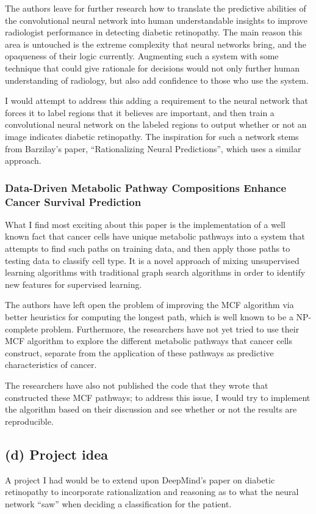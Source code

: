 \documentclass[11pt]{article}
\begin{document}
The authors leave for further research how to translate the predictive
abilities of the convolutional neural network into human understandable
insights to improve radiologist performance in detecting diabetic retinopathy.
The main reason this area is untouched is the extreme complexity that neural
networks bring, and the opaqueness of their logic currently. Augmenting such
a system with some technique that could give rationale for decisions would
not only further human understanding of radiology, but also add confidence
to those who use the system.

I would attempt to address this adding a requirement to the neural network
that forces it to label regions that it believes are important, and then
train a convolutional neural network on the labeled regions to output
whether or not an image indicates diabetic retinopathy. The inspiration
for such a network stems from Barzilay's paper, ``Rationalizing Neural
Predictions'', which uses a similar approach.

\subsubsection*{Data-Driven Metabolic Pathway Compositions Enhance Cancer Survival Prediction}
What I find most exciting about this paper is the implementation of a well
known fact that cancer cells have unique metabolic pathways into a system
that attempts to find such paths on training data, and then apply those paths
to testing data to classify cell type. It is a novel approach of mixing
unsupervised learning algorithms with traditional graph search algorithms
in order to identify new features for supervised learning.

The authors have left open the problem of improving the MCF algorithm via
better heuristics for computing the longest path, which is well known to be
a NP-complete problem. Furthermore, the researchers have not yet tried to use
their MCF algorithm to explore the different metabolic pathways that
cancer cells construct, separate from the application of these pathways as
predictive characteristics of cancer.

The researchers have also not published the code that they wrote that
constructed these MCF pathways; to address this issue, I would try to
implement the algorithm based on their discussion and see whether or
not the results are reproducible.

\subsection*{(d) Project idea}
A project I had would be to extend upon DeepMind's paper on
diabetic retinopathy to incorporate rationalization and reasoning
as to what the neural network ``saw'' when deciding a classification for
the patient.
\end{document}
